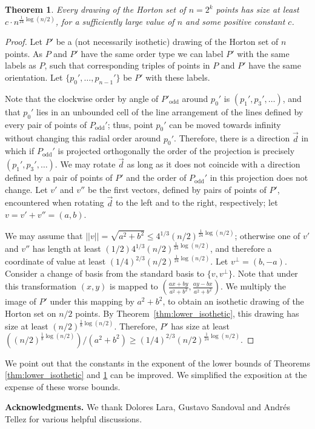 \documentclass{article}
\newtheorem{theorem}{Theorem}[section]
\begin{document}
\begin{theorem}\label{thm:lower_gen}
Every drawing of the Horton set of $n=2^k$ points has size at least $c \cdot n^{\frac{1}{24}\log (n/2)}$,
for a sufficiently large value of $n$ and some positive constant $c$.
\end{theorem}
\begin{proof}
Let $P'$ be a (not necessarily isothetic) drawing of the Horton set of $n$ points. 
  As $P$ and $P'$ have the same order type we can label $P'$ with the
 same labels as $P$, such that corresponding triples of points in $P$ and $P'$
 have the same orientation. Let $\{p_0',\dots,p_{n-1}'\}$ be $P'$
 with these labels.
 
 Note that the clockwise order by angle of $P'_{\textrm{odd}}$ around $p_0'$ is $(p_1',p_3',\dots)$, 
and that  $p_0'$ lies in an unbounded cell of the line arrangement of the lines defined
by every pair of points of $P_{\textrm{odd}}'$; thus, point $p_0'$  can be moved towards infinity without changing
 this radial order around $p_0'$. Therefore, there is a direction $\vec{d}$
 in which if $P_{\textrm{odd}}'$ is projected orthogonally the order of the projection
 is precisely $(p_1',p_3',\dots)$. We may rotate $\vec{d}$ as long as it does not coincide
 with a direction defined by a pair of points of $P'$ and the order of $P_{\textrm{odd}}'$
in this projection does not change. Let $v'$ and $v''$ be the first vectors,
defined by pairs of points of $P'$, encountered when rotating $\vec{d}$ to the left
and to the right, respectively; let $v=v'+v''=(a,b)$.

We may assume that $||v||=\sqrt{a^2+b^2}\le 4^{1/3}(n/2)^{\frac{1}{24}\log (n/2)}$; otherwise
one of $v'$ and $v''$ has length at least $(1/2)4^{1/3}(n/2)^{\frac{1}{24}\log (n/2)}$,
and therefore a coordinate of value at least $(1/4)^{2/3}(n/2)^{\frac{1}{24}\log (n/2)}$.
Let $v^{\perp}=(b,-a)$. Consider a change of basis from the standard
basis to $\{v,v^{\perp}\}$. Note that under this transformation $(x,y)$ is mapped
to $\left( \frac{ax+by}{a^2+b^2},\frac{ay-bx}{a^2+b^2} \right )$. We multiply the image
of $P'$ under this mapping by $a^2+b^2$, to obtain an isothetic drawing of the Horton
set on $n/2$ points. By Theorem~\ref{thm:lower_isothetic}, this drawing has size at least
$(n/2)^{\frac{1}{8}\log (n/2)}$. Therefore, $P'$ has size at least 
$((n/2)^{\frac{1}{8}\log (n/2)})/(a^2+b^2) \ge (1/4)^{2/3}(n/2)^{\frac{1}{24}\log (n/2)}$.
\end{proof}

We point out that the constants in the exponent of the lower bounds of Theorems
\ref{thm:lower_isothetic} and \ref{thm:lower_gen} can be improved. We 
simplified the exposition at the expense of these worse bounds.

\textbf{Acknowledgments.}
We thank Dolores Lara, Gustavo Sandoval and  Andr\'es Tellez for various
helpful discussions.


\small
 
\end{document}
